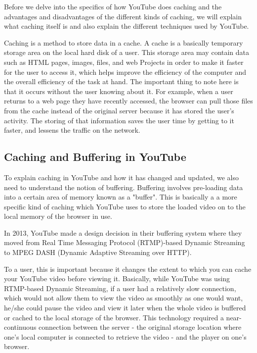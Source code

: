 Before we delve into the specifics of how YouTube does caching and the advantages and disadvantages of the different kinds of caching, we will explain what caching itself is and also explain the different techniques used by YouTube.

Caching is a method to store data in a cache. A cache is a basically temporary storage area on the local hard disk of a user. This storage area may contain data such as HTML pages, images, files, and web Projects in order to make it faster for the user to access it, which helps improve the efficiency of the computer and the overall efficiency of the task at hand. The important thing to note here is that it occurs without the user knowing about it. For example, when a user returns to a web page they have recently accessed, the browser can pull those files from the cache instead of the original server because it has stored the user's activity. The storing of that information saves the user time by getting to it faster, and lessens the traffic on the network.


\subsection{Caching and Buffering in YouTube}
To explain caching in YouTube and how it has changed and updated, we also need to understand the notion of buffering. Buffering involves pre-loading data into a certain area of memory known as a "buffer". This is basically a a more specific kind of caching which YouTube uses to store the loaded video on to the local memory of the browser in use.

In 2013, YouTube made a design decision in their buffering system where they moved from Real Time Messaging Protocol (RTMP)-based Dynamic Streaming to MPEG DASH (Dynamic Adaptive Streaming over HTTP).

To a user, this is important because it changes the extent to which you can cache your YouTube video before viewing it. Basically, while YouTube was using RTMP-based Dynamic Streaming, if a user had a relatively slow connection, which would not allow them to view the video as smoothly as one would want, he/she could pause the video and view it later when the whole video is buffered or cached to the local storage of the browser. This technology required a near-continuous connection between the server - the original storage location where one's local computer is connected to retrieve the video - and the player on one's browser.

